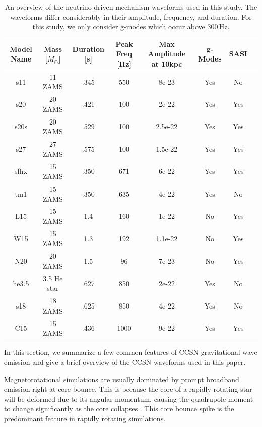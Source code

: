 \documentclass[letterpaper, aps, prd, twocolumn, superscriptaddress, showpacs, nofootinbib]{revtex4}
\begin{document}
\begin{table}[htb!]
\begin{center}
\begin{tabular}{|c|c|c|c|c|c|c|c|} %
 \hline
Model Name & Mass [$M_{\odot}$] & Duration [s] & Peak Freq [Hz] & Max Amplitude at 10kpc & g-Modes  & SASI \\ 
 \hline
s11 & 11 ZAMS & .345 & 550 & 8e-23 & Yes & No \\ 
 \hline
s20 & 20 ZAMS & .421 & 100 & 2e-22 & Yes & Yes \\
 \hline
s20s & 20 ZAMS & .529 & 100 & 2.5e-22 & Yes & Yes \\
 \hline
s27 & 27 ZAMS & .575 & 100 & 1.5e-22 & Yes & Yes \\
 \hline
sfhx & 15 ZAMS & .350 & 671 & 6e-22 & Yes & Yes \\
 \hline
tm1 & 15 ZAMS & .350 & 635 & 4e-22 & Yes & No \\
 \hline
L15 & 15 ZAMS & 1.4 & 160 & 1e-22 & No & Yes \\
 \hline
W15 & 15 ZAMS & 1.3 & 192 & 1.1e-22 & No & Yes \\
 \hline
N20 & 20 ZAMS & 1.5 & 96 & 7e-23 & No & Yes \\
 \hline
he3.5 & 3.5 He star & .627 & 850 & 2e-22 & Yes & No \\
 \hline
s18 & 18 ZAMS & .625 & 850 & 4e-22 & Yes & No \\
 \hline
C15 & 15 ZAMS & .436 & 1000 & 9e-22 & Yes & Yes \\
 \hline
 \end{tabular}
\caption{An overview of the neutrino-driven mechanism waveforms used in this study. The waveforms differ considerably in their amplitude, frequency, and duration. For this study, we only consider g-modes which occur above 300\,Hz. }
\label{tab:neutrino_waves}
\end{center}
\end{table}

In this section, we summarize a few common features of CCSN gravitational wave emission and give a brief overview of the CCSN waveforms used in this paper.  %

Magnetorotational simulations are usually dominated by prompt broadband emission right at core bounce. This is because the core of a rapidly rotating star will be deformed due to its angular momentum, causing the quadrupole moment to change significantly as the core collapses \cite{scheidegger:10b}. This core bounce spike is the predominant feature in rapidly rotating simulations.
\end{document}
